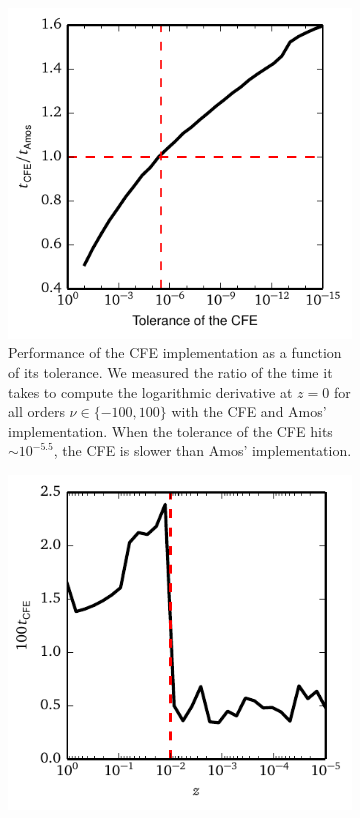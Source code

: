 \begin{figure}
 \centering
 \begin{subfigure}[t]{0.47\textwidth}
  \centering
  \includegraphics[width=\textwidth]{figs/app-numTools/timesTolerance.pdf}
  \caption{Performance of the CFE implementation as a function of its tolerance.
	   We measured the ratio of the time it takes to compute the logarithmic derivative
	   at $z=0$ for all orders $\nu\in\{-100,100\}$ with the CFE and Amos' implementation. 
	   When the tolerance of the CFE hits $\sim10^{-5.5}$, the CFE is slower than Amos'
	   implementation.}
 \end{subfigure}
 \begin{subfigure}[t]{0.47\textwidth}
  \includegraphics[width=\textwidth]{figs/app-numTools/timesPerformance.pdf}

\end{subfigure}
\end{figure}
